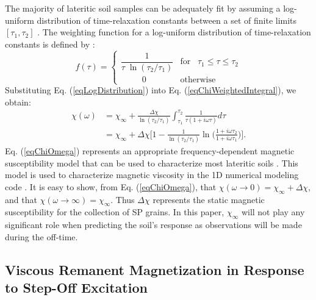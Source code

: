 \documentclass[onecolumn]{IEEEtran} %
\begin{document}
The majority of lateritic soil samples can be adequately fit by assuming a log-uniform distribution of time-relaxation constants between a set of finite limits $[\tau_1, \tau_2]$ \cite{Dabas1992,Mullins1973,Worm1998,Igel2012}. The weighting function for a log-uniform distribution of time-relaxation constants is defined by \cite{Dabas1992,Mullins1973,Billings2003,Das2006}:
\begin{equation}
\label{eqLogDistribution}
f({\tau}) =
\begin{cases}
\dfrac{1}{\tau \; \ln(\tau_2/\tau_1)} & \textrm{for} \; \; \; \tau_1 \leq \tau \leq \tau_2 \\
\; \; \; \; \; \; \; \; \; 0 & \textrm{otherwise}
\end{cases}
\end{equation}
Substituting Eq. (\ref{eqLogDistribution}) into Eq. (\ref{eqChiWeightedIntegral}), we obtain:
\begin{equation}
\begin{split}
\chi (\omega) & = \chi_\infty + \frac{\Delta \chi}{\ln (\tau_2 /\tau_1)} \int_{\tau_1}^{\tau_2} \frac{1}{\tau (1 + i\omega \tau)} d\tau  \\
&= \chi_\infty + \Delta \chi \Bigg [ 1 - \frac{1}{\ln
(\tau_2/\tau_1)} \ln \Bigg ( \frac{1 + i\omega\tau_2}{1 +
i\omega\tau_1} \Bigg ) \Bigg ].
\end{split}
 \label{eqChiOmega}
\end{equation}
Eq. (\ref{eqChiOmega}) represents an appropriate frequency-dependent magnetic susceptibility model that can be used to characterize most lateritic soils \cite{Mullins1973,Lee1984,Worm1998,Dabas1992,Pasion2007}. This model is used to characterize magnetic viscosity in the 1D numerical modeling code \cite{EM1DTM}. It is easy to show, from Eq. (\ref{eqChiOmega}), that $\chi (\omega \rightarrow 0) = \chi_\infty + \Delta \chi$, and that $\chi (\omega\rightarrow \infty) = \chi_\infty$. Thus $\Delta \chi$ represents the static magnetic susceptibility for the collection of SP grains. In this paper, $\chi_\infty$ will not play any significant role when predicting the soil's response as observations will be made during the off-time.



\subsection{Viscous Remanent Magnetization in Response to Step-Off Excitation}
\end{document}
